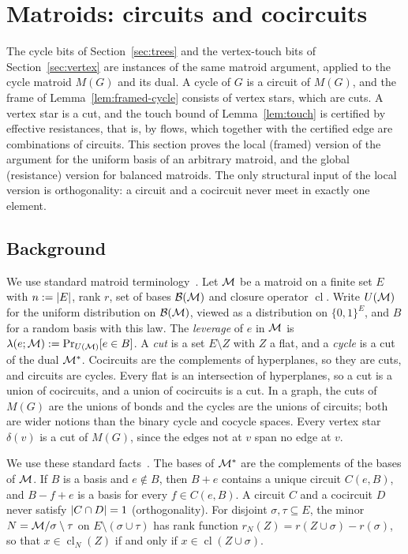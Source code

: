 \section{Matroids: circuits and cocircuits}\label{sec:matroid}

The cycle bits of Section~\ref{sec:trees} and the vertex-touch bits of Section~\ref{sec:vertex} are instances of the same matroid argument, applied to the cycle matroid $M(G)$ and its dual. A cycle of $G$ is a circuit of $M(G)$, and the frame of Lemma~\ref{lem:framed-cycle} consists of vertex stars, which are cuts. A vertex star is a cut, and the touch bound of Lemma~\ref{lem:touch} is certified by effective resistances, that is, by flows, which together with the certified edge are combinations of circuits. This section proves the local (framed) version of the argument for the uniform basis of an arbitrary matroid, and the global (resistance) version for balanced matroids. The only structural input of the local version is orthogonality: a circuit and a cocircuit never meet in exactly one element.

\subsection{Background}

We use standard matroid terminology~\cite{Oxley11}. Let $\mathcal{M}$ be a matroid on a finite set $E$ with $n:=\lvert E\rvert$, rank $r$, set of bases $\mathcal{B}(\mathcal{M})$ and closure operator $\operatorname{cl}$. Write $U(\mathcal{M})$ for the uniform distribution on $\mathcal{B}(\mathcal{M})$, viewed as a distribution on $\{0,1\}^E$, and $B$ for a random basis with this law. The \emph{leverage} of $e$ in $\mathcal{M}$ is $\lambda(e;\mathcal{M}):=\Pr_{U(\mathcal{M})}[e\in B]$. A \emph{cut} is a set $E\setminus Z$ with $Z$ a flat, and a \emph{cycle} is a cut of the dual $\mathcal{M}^*$. Cocircuits are the complements of hyperplanes, so they are cuts, and circuits are cycles. Every flat is an intersection of hyperplanes, so a cut is a union of cocircuits, and a union of cocircuits is a cut. In a graph, the cuts of $M(G)$ are the unions of bonds and the cycles are the unions of circuits; both are wider notions than the binary cycle and cocycle spaces. Every vertex star $\delta(v)$ is a cut of $M(G)$, since the edges not at $v$ span no edge at $v$.

We use these standard facts~\cite[Chapters~1--3]{Oxley11}. The bases of $\mathcal{M}^*$ are the complements of the bases of $\mathcal{M}$. If $B$ is a basis and $e\notin B$, then $B+e$ contains a unique circuit $C(e,B)$, and $B-f+e$ is a basis for every $f\in C(e,B)$. A circuit $C$ and a cocircuit $D$ never satisfy $\lvert C\cap D\rvert=1$ (orthogonality). For disjoint $\sigma,\tau\subseteq E$, the minor $N=\mathcal{M}/\sigma\setminus\tau$ on $E\setminus(\sigma\cup\tau)$ has rank function $r_N(Z)=r(Z\cup\sigma)-r(\sigma)$, so that $x\in\operatorname{cl}_N(Z)$ if and only if $x\in\operatorname{cl}(Z\cup\sigma)$.

